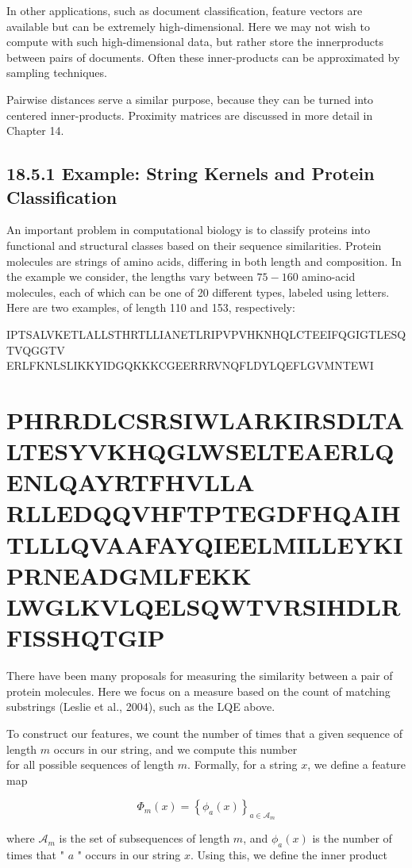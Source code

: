 \documentclass[10pt]{article}
\begin{document}
In other applications, such as document classification, feature vectors are available but can be extremely high-dimensional. Here we may not wish to compute with such high-dimensional data, but rather store the innerproducts between pairs of documents. Often these inner-products can be approximated by sampling techniques.

Pairwise distances serve a similar purpose, because they can be turned into centered inner-products. Proximity matrices are discussed in more detail in Chapter 14.

\subsection*{18.5.1 Example: String Kernels and Protein Classification}
An important problem in computational biology is to classify proteins into functional and structural classes based on their sequence similarities. Protein molecules are strings of amino acids, differing in both length and composition. In the example we consider, the lengths vary between $75-160$ amino-acid molecules, each of which can be one of 20 different types, labeled using letters. Here are two examples, of length 110 and 153, respectively:

IPTSALVKETLALLSTHRTLLIANETLRIPVPVHKNHQLCTEEIFQGIGTLESQTVQGGTV ERLFKNLSLIKKYIDGQKKKCGEERRRVNQFLDYLQEFLGVMNTEWI

\section*{PHRRDLCSRSIWLARKIRSDLTALTESYVKHQGLWSELTEAERLQENLQAYRTFHVLLA RLLEDQQVHFTPTEGDFHQAIHTLLLQVAAFAYQIEELMILLEYKIPRNEADGMLFEKK LWGLKVLQELSQWTVRSIHDLRFISSHQTGIP}
There have been many proposals for measuring the similarity between a pair of protein molecules. Here we focus on a measure based on the count of matching substrings (Leslie et al., 2004), such as the LQE above.

To construct our features, we count the number of times that a given sequence of length $m$ occurs in our string, and we compute this number\\
for all possible sequences of length $m$. Formally, for a string $x$, we define a feature map


\begin{equation*}
\Phi_{m}(x)=\left\{\phi_{a}(x)\right\}_{a \in \mathcal{A}_{m}} \tag{18.25}
\end{equation*}


where $\mathcal{A}_{m}$ is the set of subsequences of length $m$, and $\phi_{a}(x)$ is the number of times that " $a$ " occurs in our string $x$. Using this, we define the inner product
\end{document}
